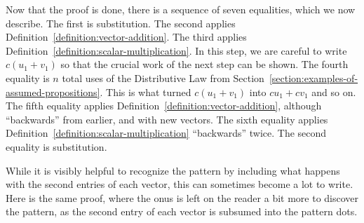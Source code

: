 \documentclass{book}
\theoremstyle{ekimcustom}
\begin{document}
Now that the proof is done, there is a sequence of seven equalities, which we now describe. The first is substitution. The second applies Definition~\ref{definition:vector-addition}. The third applies Definition~\ref{definition:scalar-multiplication}. In this step, we are careful to write $c(u_1+v_1)$ so that the crucial work of the next step can be shown. The fourth equality is $n$ total uses of the Distributive Law from Section~\ref{section:examples-of-assumed-propositions}. This is what turned $c(u_1+v_1)$ into $cu_1+cv_1$ and so on. The fifth equality applies Definition~\ref{definition:vector-addition}, although ``backwards'' from earlier, and with new vectors. The sixth equality applies Definition~\ref{definition:scalar-multiplication} ``backwards'' twice. The second equality is substitution.

While it is visibly helpful to recognize the pattern by including what happens with the second entries of each vector, this can sometimes become a lot to write. Here is the same proof, where the onus is left on the reader a bit more to discover the pattern, as the second entry of each vector is subsumed into the pattern dots.
\end{document}
